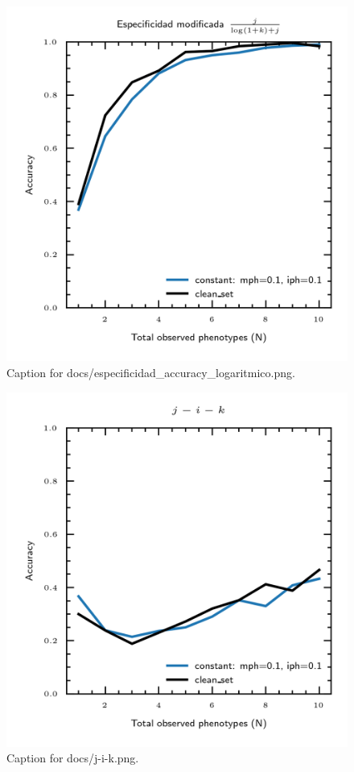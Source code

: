 \documentclass{article}
\begin{document}
\begin{figure}[h] \centering \includegraphics{docs/especificidad_accuracy_logaritmico.png} \caption{Caption for docs/especificidad_accuracy_logaritmico.png.} \end{figure}
\begin{figure}[h] \centering \includegraphics{docs/j-i-k.png} \caption{Caption for docs/j-i-k.png.} \end{figure}
\end{document}
